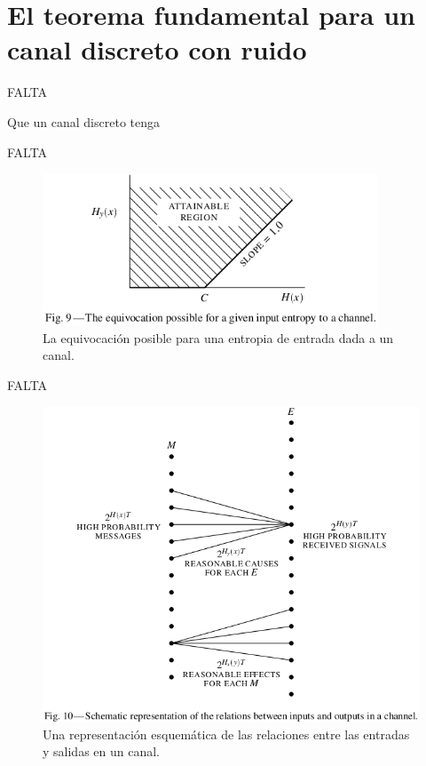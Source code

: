 \clearpage

\chapter{El teorema fundamental para un canal discreto con ruido}
\label{sec:13}

FALTA

\begin{theorem}
\label{th:11}
Que un canal discreto tenga
\end{theorem}

FALTA

\begin{figure}[!ht]
\centerline{\includegraphics[width=100mm]{Imagenes/Pagina22-Figura9.png}}
\caption{La equivocaci\'{o}n posible para una entropia de entrada dada
  a un canal.}
\label{fig:9}
\end{figure}

FALTA

\begin{figure}[!ht]
\centerline{\includegraphics[width=140mm]{Imagenes/Pagina23-Figura10.png}}
\caption{Una representaci\'{o}n esquem\'{a}tica de las relaciones
  entre las entradas y salidas en un canal.}
\label{fig:10}
\end{figure}

